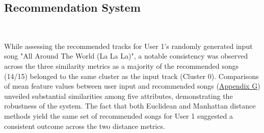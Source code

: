 \documentclass{article}
\begin{document}
\subsection{Recommendation System}

\begin{table} [ht]
\\[1ex]
\caption{Recommendations for User 1. Cluster numbers mentioned in '[]' after song title}
\label{tab:template2}
\end{table}

While assessing the recommended tracks for User 1's randomly generated input song "All Around The World (La La La)", a notable consistency was observed across the three similarity metrics as a majority of the recommended songs (14/15) belonged to the same cluster as the input track (Cluster 0). Comparisons of mean feature values between user input and recommended songs (\hyperref[app:RECOM_MEAN_PLOT]{{Appendix G}}) unveiled substantial similarities among five attributes, demonstrating the robustness of the system. The fact that both Euclidean and Manhattan distance methods yield the same set of recommended songs for User 1 suggested a consistent outcome across the two distance metrics. 
\end{document}
